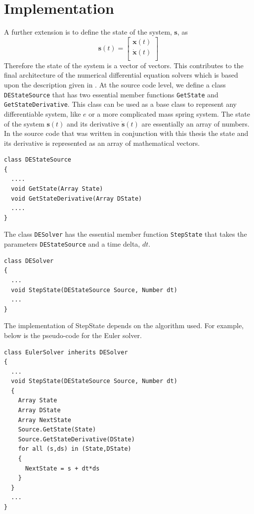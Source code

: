 \section{Implementation}
\label{DESovlers:sec:Arch}
A further extension is to define the state of the system, $\mathbf{s}$, as 
\[
	\mathbf{s}(t) = 
    \begin{bmatrix}
	    \mathbf{x}(t) \\ 
	    \mathbf{\dot{x}}(t) \\
	\end{bmatrix}
\] 
Therefore the state of the system is a vector of vectors. This contributes to
the final architecture of the numerical differential equation solvers which is
based upon the description given in \cite{PBMNotes}. At the source code level, we
define a class \verb|DEStateSource| that has two essential member functions
\verb|GetState| and \verb|GetStateDerivative|. This class can be used as a base
class to represent any differentiable system, like $e$ or a more complicated
mass spring system. The state of the system $\mathbf{s}(t)$ and its derivative
$\mathbf{\dot{s}}(t)$ are essentially an array of numbers. In the source code
that was written in conjunction with this thesis the state and its derivative is
represented as an array of mathematical vectors.
\lstset{language=C++}
\begin{lstlisting}[basicstyle={\ttfamily \footnotesize}]
class DEStateSource
{
  ....
  void GetState(Array State)
  void GetStateDerivative(Array DState)
  ....
}
\end{lstlisting}
The class \verb|DESolver| has the essential member function \verb|StepState|
that takes the parameters \verb|DEStateSource| and a time delta, $dt$.
\lstset{language=C++}
\begin{lstlisting}[basicstyle={\ttfamily \footnotesize}]
class DESolver
{
  ...
  void StepState(DEStateSource Source, Number dt)
  ...
}
\end{lstlisting}
The implementation of StepState depends on the algorithm used. For example,
below is the pseudo-code for the Euler solver.
\lstset{language=C++}
\begin{lstlisting}[basicstyle={\ttfamily \footnotesize}]
class EulerSolver inherits DESolver
{
  ...
  void StepState(DEStateSource Source, Number dt)
  {
    Array State
    Array DState
    Array NextState
    Source.GetState(State)
    Source.GetStateDerivative(DState)
    for all (s,ds) in (State,DState)
    {
      NextState = s + dt*ds
    }
  }
  ...
}
\end{lstlisting}


